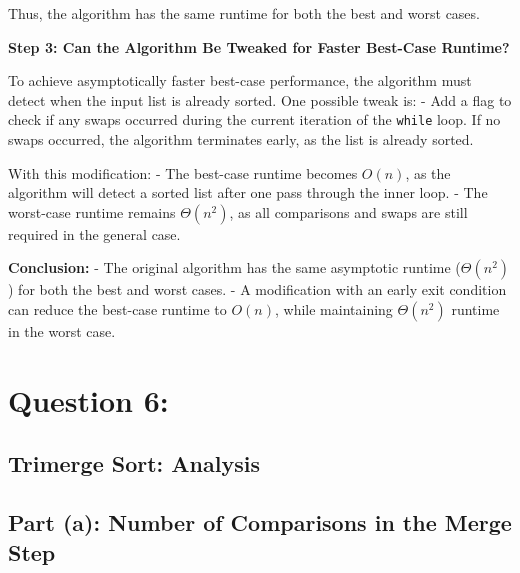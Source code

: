 \documentclass{article}
\begin{document}
Thus, the algorithm has the same runtime for both the best and worst cases.

\textbf{Step 3: Can the Algorithm Be Tweaked for Faster Best-Case Runtime?}

To achieve asymptotically faster best-case performance, the algorithm must detect when the input list is already sorted. One possible tweak is:
- Add a flag to check if any swaps occurred during the current iteration of the \texttt{while} loop. If no swaps occurred, the algorithm terminates early, as the list is already sorted.

With this modification:
- The best-case runtime becomes \( O(n) \), as the algorithm will detect a sorted list after one pass through the inner loop.
- The worst-case runtime remains \( \Theta(n^2) \), as all comparisons and swaps are still required in the general case.

\textbf{Conclusion:}
- The original algorithm has the same asymptotic runtime (\( \Theta(n^2) \)) for both the best and worst cases.
- A modification with an early exit condition can reduce the best-case runtime to \( O(n) \), while maintaining \( \Theta(n^2) \) runtime in the worst case.

\pagebreak
\section*{Question 6:}
\subsection*{Trimerge Sort: Analysis}



\subsection*{Part (a): Number of Comparisons in the Merge Step}
\end{document}
